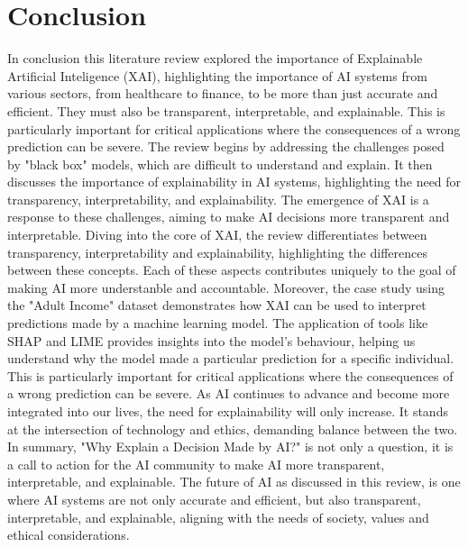 \documentclass[10pt,journal,compsoc]{IEEEtran}
\begin{document}
\section{Conclusion}
In conclusion this literature review explored the importance of Explainable Artificial Inteligence (XAI), highlighting the importance of AI systems from various sectors, from healthcare to finance, to be more than just accurate and efficient.
They must also be transparent, interpretable, and explainable. This is particularly important for critical applications where the consequences of a wrong prediction can be severe. 
The review begins by addressing the challenges posed by "black box" models, which are difficult to understand and explain. It then discusses the importance of explainability in AI systems, highlighting the need for transparency, interpretability, and explainability.
The emergence of XAI is a response to these challenges, aiming to make AI decisions more transparent and interpretable. Diving into the core of XAI, the review differentiates between transparency, interpretability and explainability, highlighting the differences between these concepts.
Each of these aspects contributes uniquely to the goal of making AI more understanble and accountable.
Moreover, the case study using the "Adult Income" dataset demonstrates how XAI can be used to interpret predictions made by a machine learning model. The application of tools like SHAP and LIME provides insights into the model's behaviour, helping us understand why the model made a particular prediction for a specific individual.
This is particularly important for critical applications where the consequences of a wrong prediction can be severe.
As AI continues to advance and become more integrated into our lives, the need for explainability will only increase. It stands at the intersection of technology and ethics, demanding balance between the two.
In summary, "Why Explain a Decision Made by AI?" is not only a question, it is a call to action for the AI community to make AI more transparent, interpretable, and explainable. The future of AI as discussed in this review, is one where AI systems are not only accurate and efficient, but also transparent, interpretable, and explainable, aligning with the needs of society, values and ethical considerations.



\printbibliography
\end{document}
